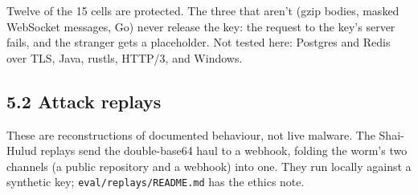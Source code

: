 \documentclass[
  11pt]{article}
\begin{document}
Twelve of the 15 cells are protected.
The three that aren't (gzip bodies,
masked WebSocket messages, Go) never
release the key: the request to the
key's server fails, and the stranger
gets a placeholder. Not tested here:
Postgres and Redis over TLS, Java,
rustls, HTTP/3, and Windows.

\subsection*{5.2 Attack
replays}\label{attack-replays}

These are reconstructions of documented
behaviour, not live malware. The
Shai-Hulud replays send the
double-base64 haul to a webhook, folding
the worm's two channels (a public
repository and a webhook) into one. They
run locally against a synthetic key;
\texttt{eval/replays/README.md} has the
ethics note.
\end{document}
